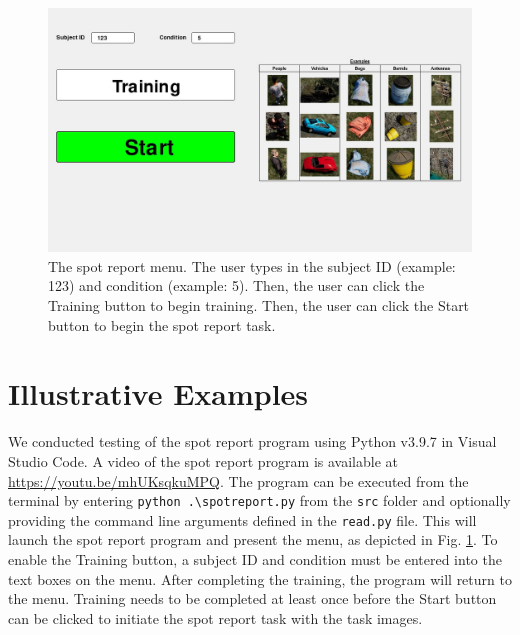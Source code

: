 \documentclass[preprint,12pt, a4paper]{elsarticle}
\begin{document}
\begin{figure}[t]
    \centering
    \includegraphics[width=1.0\textwidth]{Figures/menu.jpg}
    \caption{The spot report menu. The user types in the subject ID (example: 123) and condition (example: 5). Then, the user can click the Training button to begin training. Then, the user can click the Start button to begin the spot report task.}
    \label{fig:menu}
\end{figure}

\section{Illustrative Examples}
We conducted testing of the spot report program using Python v3.9.7 in Visual Studio Code. A video of the spot report program is available at \url{https://youtu.be/mhUKsqkuMPQ}. The program can be executed from the terminal by entering \texttt{python .\textbackslash spotreport.py} from the \texttt{src} folder and optionally providing the command line arguments defined in the \texttt{read.py} file. This will launch the spot report program and present the menu, as depicted in Fig. \ref{fig:menu}. To enable the Training button, a subject ID and condition must be entered into the text boxes on the menu. After completing the training, the program will return to the menu. Training needs to be completed at least once before the Start button can be clicked to initiate the spot report task with the task images. \vspace{0.1mm}
\end{document}
